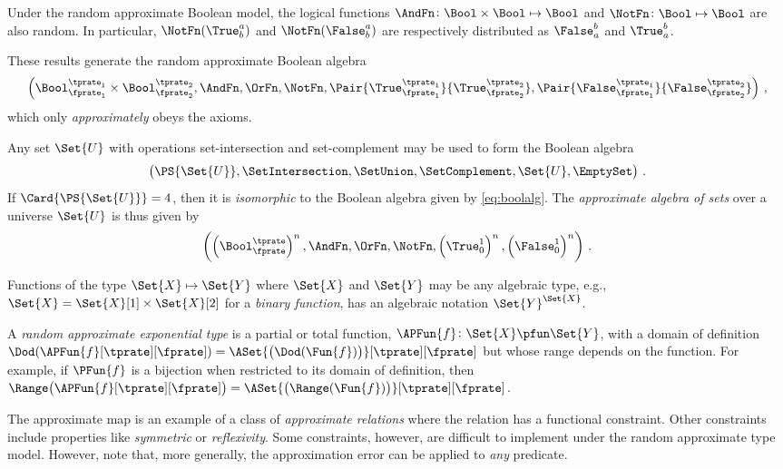 \documentclass[ ../main.tex]{subfiles}
\begin{document}
Under the random approximate Boolean model, the logical functions $\AndFn \colon \Bool \times \Bool \mapsto \Bool$ and $\NotFn \colon \Bool \mapsto \Bool$ are also random.
In particular, $\NotFn(\True_b^a)$ and $\NotFn(\False_b^a)$ are respectively distributed as  $\False_a^b$ and  $\True_a^b$.

These results generate the random approximate Boolean algebra
\begin{equation}
\label{eq:boolalg}
\left(
	\Bool_{\fprate_1}^{\tprate_1} \times \Bool_{\fprate_2}^{\tprate_2},
	\AndFn, \OrFn, \NotFn,
	\Pair{\True_{\fprate_1}^{\tprate_1}}{\True_{\fprate_2}^{\tprate_2}},
	\Pair{\False_{\fprate_1}^{\tprate_1}}{\False_{\fprate_2}^{\tprate_2}}
\right)\,,
\end{equation}
which only \emph{approximately} obeys the axioms.

Any set $\Set{U}$ with operations set-intersection and set-complement may be used to form the Boolean algebra
\begin{equation}
\left(
	\PS{\Set{U}},
	\SetIntersection, \SetUnion, \SetComplement,
	\Set{U},
	\EmptySet
\right)\,.
\end{equation}
If $\Card{\PS{\Set{U}}} = 4$, then it is \emph{isomorphic} to the Boolean algebra given by \cref{eq:boolalg}.
The \emph{approximate algebra of sets} over a universe $\Set{U}$ is thus given by
\begin{equation}
\left(
	\left(\Bool_{\fprate}^{\tprate}\right)^n,
	\AndFn, \OrFn, \NotFn,
	\left(\True_{0}^{1}\right)^n,
	\left(\False_{0}^{1}\right)^n
\right)\,.
\end{equation}


Functions of the type $\Set{X} \mapsto \Set{Y}$ where $\Set{X}$ and $\Set{Y}$ may be any algebraic type, e.g., $\Set{X} = \Set{X}[1] \times \Set{X}[2]$ for a \emph{binary function}, has an algebraic notation $\Set{Y}^{\Set{X}}$.

A \emph{random approximate exponential type} is a partial or total function, $\APFun{f} \colon \Set{X} \pfun \Set{Y}$, with a domain of definition $\Dod(\APFun{f}[\tprate][\fprate]) = \ASet{\left(\Dod(\Fun{f})\right)}[\tprate][\fprate]$ but whose range depends on the function.
For example, if $\PFun{f}$ is a bijection when restricted to its domain of definition, then $\Range\!\left(\APFun{f}[\tprate][\fprate]\right) = \ASet{\left(\Range(\Fun{f})\right)}[\tprate][\fprate]$.

The approximate map is an example of a class of \emph{approximate relations} where the relation has a functional constraint.
Other constraints include properties like \emph{symmetric} or \emph{reflexivity}.
Some constraints, however, are difficult to implement under the random approximate type model.
However, note that, more generally, the approximation error can be applied to \emph{any} predicate.
\end{document}
